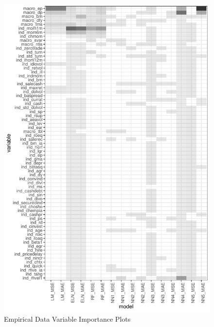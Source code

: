 \documentclass[a4paper, table]{article}
\begin{document}
\begin{figure}
	\includegraphics{empirical_sample_1_vi.pdf}
	\caption{Empirical Data Variable Importance Plots}
\end{figure}
\end{document}
